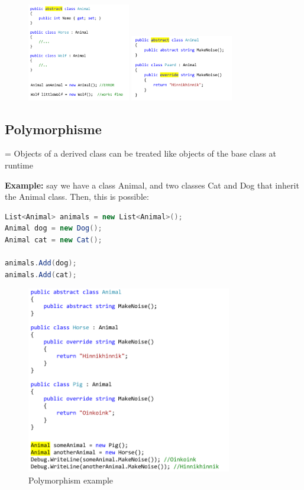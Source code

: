 \documentclass{article}
\newcommand{\bold}[1]{\textbf{#1}}
\begin{document}
\begin{figure}[H]
    \centering
    \includegraphics[width=0.4\textwidth]{inheritance-abstract.png}
    \includegraphics[width=0.4\textwidth]{inheritance-abstract2.png}
    \caption{}
\end{figure}


\subsection{Polymorphisme}

= Objects of a derived class can be treated like objects of the base class at runtime

\bold{Example:} say we have a class Animal, and two classes Cat and Dog that inherit the Animal class.
Then, this is possible: 

\begin{lstlisting}[language=csharp]
List<Animal> animals = new List<Animal>();
Animal dog = new Dog();
Animal cat = new Cat();

animals.Add(dog);
animals.Add(cat);
\end{lstlisting}

\begin{figure}[H]
    \centering
    \includegraphics[width=0.8\textwidth]{polymorphism.png}
    \caption{Polymorphism example}
\end{figure}
\end{document}
